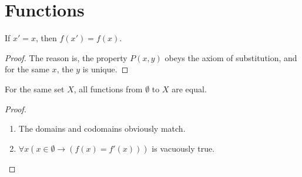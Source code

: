 \section{Functions}
\begin{why}{42}
	If $x'=x$, then $f(x')=f(x)$.
\end{why}
\begin{proof}
	The reason is, the property $P(x,y)$ obeys the axiom of substitution, and for the same $x$, the $y$ is unique.
\end{proof}

\begin{why}{43} \label{why.empty.func.is.unique}
	For the same set $X$, all functions from $\emptyset$ to $X$ are equal.
\end{why}
\begin{proof}\leavevmode
	\begin{enumerate}
		\item The domains and codomains obviously match.
		\item $\forall x(x \in \emptyset \to (f(x) = f'(x)))$ is vacuously true.
	\end{enumerate}
\end{proof}

